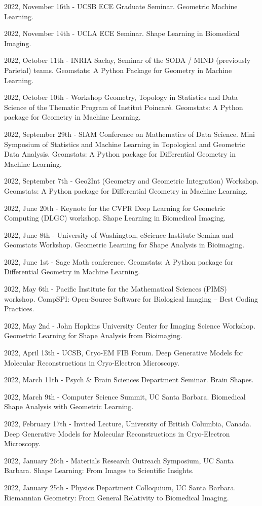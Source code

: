 2022, November 16th - UCSB ECE Graduate Seminar. Geometric Machine Learning.

2022, November 14th - UCLA ECE Seminar. Shape Learning in Biomedical Imaging.

2022, October 11th - INRIA Saclay, Seminar of the SODA / MIND (previously Parietal) teams. Geomstats: A Python Package for Geometry in Machine Learning.

2022, October 10th - Workshop Geometry, Topology in Statistics and Data Science of the Thematic Program of Institut Poincaré. Geomstats: A Python package for Geometry in Machine Learning.

2022, September 29th - SIAM Conference on Mathematics of Data Science. Mini Symposium of Statistics and Machine Learning in Topological and Geometric Data Analysis. Geomstats: A Python package for Differential Geometry in Machine Learning.

2022, September 7th - Geo2Int (Geometry and Geometric Integration) Workshop. Geomstats: A Python package for Differential Geometry in Machine Learning.

2022, June 20th - Keynote for the CVPR Deep Learning for Geometric Computing (DLGC) workshop. Shape Learning in Biomedical Imaging.

2022, June 8th - University of Washington, eScience Institute Semina and Geomstats Workshop. Geometric Learning for Shape Analysis in Bioimaging.

2022, June 1st - Sage Math conference. Geomstats: A Python package for Differential Geometry in Machine Learning.

2022, May 6th - Pacific Institute for the Mathematical Sciences (PIMS) workshop. CompSPI: Open-Source Software for Biological Imaging – Best Coding Practices.

2022, May 2nd - John Hopkins University Center for Imaging Science Workshop. Geometric Learning for Shape Analysis from Bioimaging. 

2022, April 13th - UCSB, Cryo-EM FIB Forum. Deep Generative Models for Molecular Reconstructions in Cryo-Electron Microscopy.

2022, March 11th - Psych \& Brain Sciences Department Seminar. Brain Shapes.

2022, March 9th - Computer Science Summit, UC Santa Barbara. Biomedical Shape Analysis with Geometric Learning.

2022, February 17th - Invited Lecture, University of British Columbia, Canada. Deep Generative Models for Molecular Reconstructions in Cryo-Electron Microscopy.

2022, January 26th - Materials Research Outreach Symposium, UC Santa Barbara. Shape Learning: From Images to Scientific Insights.

2022, January 25th - Physics Department Colloquium, UC Santa Barbara. Riemannian Geometry: From General Relativity to Biomedical Imaging.